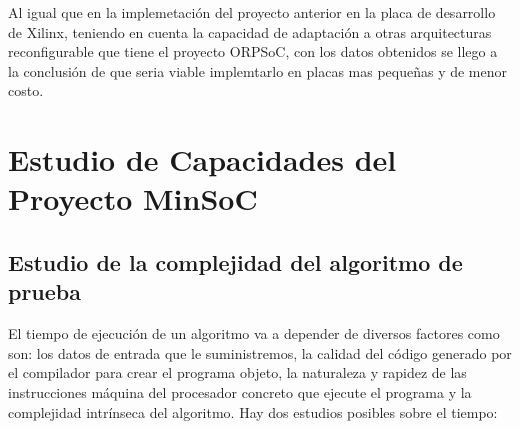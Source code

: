 Al igual que en la implemetación del proyecto anterior en la placa de desarrollo de Xilinx,  teniendo en cuenta la capacidad de adaptación a otras arquitecturas reconfigurable que tiene el proyecto ORPSoC, con los datos obtenidos se llego a la conclusión de que seria viable implemtarlo en placas mas pequeñas y de menor costo.

%
%
%
%



\newpage
\section {Estudio de Capacidades del Proyecto MinSoC}
		
		\subsection{Estudio de la complejidad del algoritmo de prueba}
		
		El tiempo de ejecución de un algoritmo va a depender de diversos factores como son: los datos de entrada que le suministremos, la calidad del
		código generado por el compilador para crear el programa objeto, la naturaleza y rapidez  de las instrucciones máquina del procesador concreto que
		ejecute el programa y la complejidad intrínseca del algoritmo. Hay dos estudios posibles sobre el tiempo: 
 
